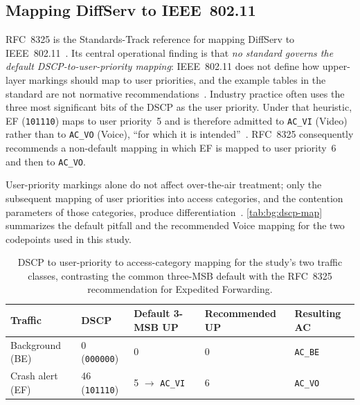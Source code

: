 \subsection{Mapping DiffServ to IEEE~802.11}
\label{sec:bg:rfc8325}

RFC~8325 is the Standards-Track reference for mapping DiffServ to IEEE~802.11~\cite{RFC8325_WiFi_QoS}.
Its central operational finding is that \emph{no standard governs the default DSCP-to-user-priority mapping}: IEEE~802.11 does not define how upper-layer markings should map to user priorities, and the example tables in the standard are not normative recommendations~\cite{RFC8325_WiFi_QoS}.
Industry practice often uses the three most significant bits of the DSCP as the user priority.
Under that heuristic, EF (\texttt{101110}) maps to user priority~5 and is therefore admitted to \texttt{AC\_VI} (Video) rather than to \texttt{AC\_VO} (Voice), ``for which it is intended''~\cite{RFC8325_WiFi_QoS}.
RFC~8325 consequently recommends a non-default mapping in which EF is mapped to user priority~6 and then to \texttt{AC\_VO}.

User-priority markings alone do not affect over-the-air treatment; only the subsequent mapping of user priorities into access categories, and the contention parameters of those categories, produce differentiation~\cite{RFC8325_WiFi_QoS}.
\autoref{tab:bg:dscp-map} summarizes the default pitfall and the recommended Voice mapping for the two codepoints used in this study.

\begin{table}[htb]
	\ABNTEXfontereduzida
	\caption{\label{tab:bg:dscp-map}DSCP to user-priority to access-category mapping for the study's two traffic classes, contrasting the common three-MSB default with the RFC~8325 recommendation for Expedited Forwarding.}
	\begin{center}
		\begin{tabular}{@{}lllll@{}}
		    \toprule
		    Traffic & DSCP & Default 3-MSB UP & Recommended UP & Resulting AC \\
		    \midrule
		    Background (BE) & 0 (\texttt{000000}) & 0 & 0 & \texttt{AC\_BE} \\
		    Crash alert (EF) & 46 (\texttt{101110}) & 5 $\rightarrow$ \texttt{AC\_VI} & 6 & \texttt{AC\_VO} \\
		    \bottomrule
		  \end{tabular}
	\end{center}
\end{table}

